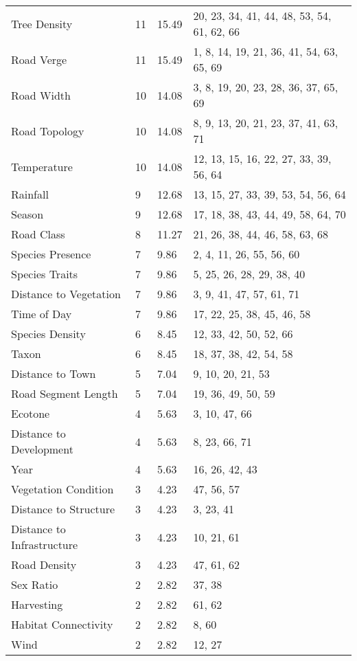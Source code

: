 \begin{longtable}[c]{@{}p{3.5cm}p{2.0cm}p{2.5cm}p{5.5cm}@{}}
  Tree Density &  11 & 15.49 & 20, 23, 34, 41, 44, 48, 53, 54, 61, 62, 66 \\ 
  Road Verge &  11 & 15.49 & 1, 8, 14, 19, 21, 36, 41, 54, 63, 65, 69 \\ 
  Road Width &  10 & 14.08 & 3, 8, 19, 20, 23, 28, 36, 37, 65, 69 \\ 
  Road Topology &  10 & 14.08 & 8, 9, 13, 20, 21, 23, 37, 41, 63, 71 \\ 
  Temperature &  10 & 14.08 & 12, 13, 15, 16, 22, 27, 33, 39, 56, 64 \\ 
  Rainfall &   9 & 12.68 & 13, 15, 27, 33, 39, 53, 54, 56, 64 \\ 
  Season &   9 & 12.68 & 17, 18, 38, 43, 44, 49, 58, 64, 70 \\ 
  Road Class &   8 & 11.27 & 21, 26, 38, 44, 46, 58, 63, 68 \\ 
  Species Presence &   7 & 9.86 & 2, 4, 11, 26, 55, 56, 60 \\ 
  Species Traits &   7 & 9.86 & 5, 25, 26, 28, 29, 38, 40 \\ 
  Distance to Vegetation &   7 & 9.86 & 3, 9, 41, 47, 57, 61, 71 \\ 
  Time of Day &   7 & 9.86 & 17, 22, 25, 38, 45, 46, 58 \\ 
  Species Density &   6 & 8.45 & 12, 33, 42, 50, 52, 66 \\ 
  Taxon &   6 & 8.45 & 18, 37, 38, 42, 54, 58 \\ 
  Distance to Town &   5 & 7.04 & 9, 10, 20, 21, 53 \\ 
  Road Segment Length &   5 & 7.04 & 19, 36, 49, 50, 59 \\ 
  Ecotone &   4 & 5.63 & 3, 10, 47, 66 \\ 
  Distance to Development &   4 & 5.63 & 8, 23, 66, 71 \\ 
  Year &   4 & 5.63 & 16, 26, 42, 43 \\ 
  Vegetation Condition &   3 & 4.23 & 47, 56, 57 \\ 
  Distance to Structure &   3 & 4.23 & 3, 23, 41 \\ 
  Distance to Infrastructure &   3 & 4.23 & 10, 21, 61 \\ 
  Road Density &   3 & 4.23 & 47, 61, 62 \\ 
  Sex Ratio &   2 & 2.82 & 37, 38 \\ 
  Harvesting &   2 & 2.82 & 61, 62 \\ 
  Habitat Connectivity &   2 & 2.82 & 8, 60 \\ 
  Wind &   2 & 2.82 & 12, 27 \\ 

\end{longtable}
